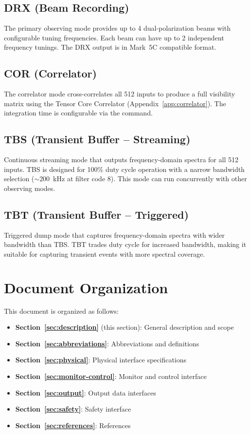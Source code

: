 \subsection{DRX (Beam Recording)}

The primary observing mode provides up to 4 dual-polarization beams with configurable tuning frequencies. Each beam can have up to 2 independent frequency tunings. The DRX output is in Mark~5C compatible format.

\subsection{COR (Correlator)}

The correlator mode cross-correlates all 512 inputs to produce a full visibility matrix using the Tensor Core Correlator (Appendix~\ref{app:correlator}). The integration time is configurable via the  command.

\subsection{TBS (Transient Buffer -- Streaming)}

Continuous streaming mode that outputs frequency-domain spectra for all 512 inputs. TBS is designed for 100\% duty cycle operation with a narrow bandwidth selection ($\sim$200~kHz at filter code 8). This mode can run concurrently with other observing modes.

\subsection{TBT (Transient Buffer -- Triggered)}

Triggered dump mode that captures frequency-domain spectra with wider bandwidth than TBS. TBT trades duty cycle for increased bandwidth, making it suitable for capturing transient events with more spectral coverage.

\section{Document Organization}

This document is organized as follows:
\begin{itemize}
    \item \textbf{Section~\ref{sec:description}} (this section): General description and scope
    \item \textbf{Section~\ref{sec:abbreviations}}: Abbreviations and definitions
    \item \textbf{Section~\ref{sec:physical}}: Physical interface specifications
    \item \textbf{Section~\ref{sec:monitor-control}}: Monitor and control interface
    \item \textbf{Section~\ref{sec:output}}: Output data interfaces
    \item \textbf{Section~\ref{sec:safety}}: Safety interface
    \item \textbf{Section~\ref{sec:references}}: References
\end{itemize}
